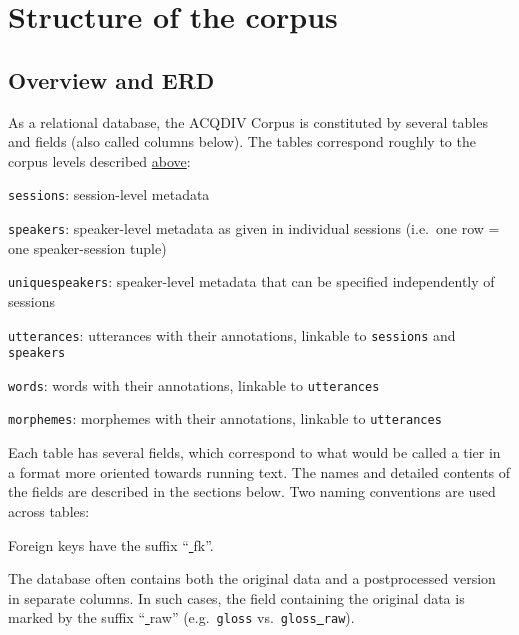 \documentclass[a4paper, 11pt]{book}
\newcommand{\und}{\underline{{ }}\hspace{0.2mm}}	%
\begin{document}
\section{Structure of the corpus}
\label{sec:Structure of the corpus}

\subsection{Overview and ERD}

As a relational database, the ACQDIV Corpus is constituted by several tables and fields (also called columns below). The tables correspond roughly to the corpus levels described \hyperref[sec:Architecture]{above}: 

\begin{itemize*}
	\item \texttt{sessions}: session-level metadata
	\item \texttt{speakers}: speaker-level metadata as given in individual sessions (i.e.\ one row = one speaker-session tuple)
	\item \texttt{uniquespeakers}: speaker-level metadata that can be specified independently of sessions
	\item \texttt{utterances}: utterances with their annotations, linkable to \texttt{sessions} and \texttt{speakers}
	\item \texttt{words}: words with their annotations, linkable to \texttt{utterances}
	\item \texttt{morphemes}: morphemes with their annotations, linkable to \texttt{utterances} %
\end{itemize*}

Each table has several fields, which correspond to what would be called a tier in a format more oriented towards running text. The names and detailed contents of the fields are described in the sections below. Two naming conventions are used across tables: 

\begin{itemize*}
	\item Foreign keys have the suffix “\und fk”. 
	\item The database often contains both the original data and a postprocessed version in separate columns. In such cases, the field containing the original data
		is marked by the suffix “\und raw” (e.g.\ \texttt{gloss} vs.\ \texttt{gloss\und raw}). 
\end{itemize*}
\end{document}
